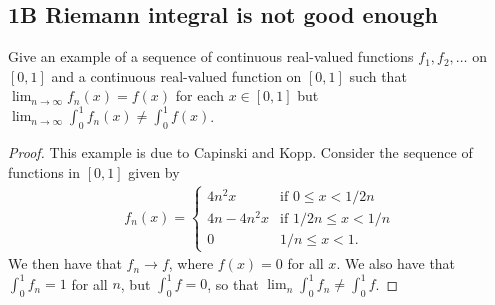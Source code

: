 \subsection{1B Riemann integral is not good enough}


\begin{exercise}{5}
Give an example of a sequence of continuous real-valued functions $f_1,f_2,\dots$ on $[0,1]$ and a continuous real-valued function on $[0,1]$ such that $\lim_{n\to\infty} f_n(x)= f(x)$ for each $x\in [0,1]$ but $\lim_{n\to\infty}\int_0^1 f_n(x) \neq \int_0^1 f(x)$.
\end{exercise}
\begin{proof}
This example is due to Capinski and Kopp.
Consider the sequence of functions in $[0,1]$ given by
\begin{align*}
    f_n(x) =
    \begin{cases}
        4n^2x &\text{if }0\leq x<1/2n\\
        4n-4n^2x &\text{if }1/2n\leq x < 1/n\\
        0 &1/n\leq x < 1.
    \end{cases}
\end{align*}
We then have that $f_n\to f$, where $f(x)=0$ for all $x$.
We also have that $\int_0^1 f_n=1$ for all $n$, but $\int_0^1 f=0$, so that $\lim_n \int_0^1 f_n \neq \int_0^1 f$.
\end{proof} 
